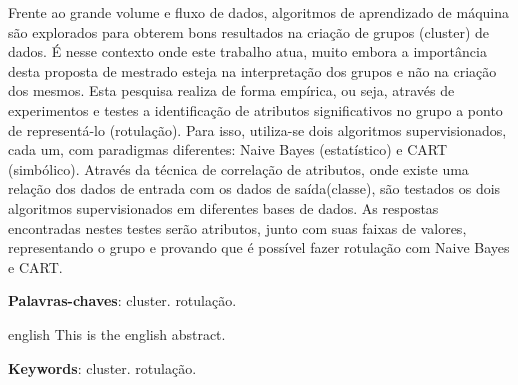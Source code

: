
\setlength{\absparsep}{18pt} %
\begin{resumo}
Frente ao grande volume e fluxo de dados, algoritmos de aprendizado de máquina são explorados para obterem bons resultados na criação de grupos (cluster) de dados. É nesse contexto onde este trabalho atua, muito embora a importância desta proposta de mestrado esteja na interpretação dos grupos e não na criação dos mesmos. Esta pesquisa realiza de forma empírica, ou seja, através de experimentos e testes a identificação de atributos significativos no grupo a ponto de representá-lo (rotulação). Para isso, utiliza-se dois algoritmos supervisionados, cada um, com paradigmas diferentes: Naive Bayes (estatístico) e CART (simbólico). Através da técnica de correlação de atributos, onde existe uma relação dos dados de entrada com os dados de saída(classe), são testados os dois algoritmos supervisionados em diferentes bases de dados. As respostas encontradas nestes testes serão atributos, junto com suas faixas de valores, representando o grupo e provando que é possível fazer rotulação com Naive Bayes e CART.


  \textbf{Palavras-chaves}: cluster. rotulação.
\end{resumo}

\begin{resumo}[Abstract]
 \begin{otherlanguage*}{english}
   This is the english abstract.

   \vspace{\onelineskip}
 
   \noindent 
   \textbf{Keywords}:  cluster. rotulação.
 \end{otherlanguage*}
\end{resumo}
